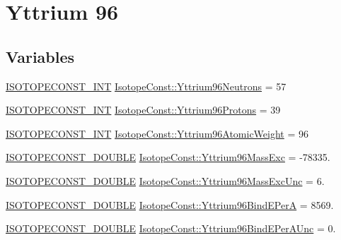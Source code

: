 \hypertarget{group___isotope_const-_yttrium-_y96}{}\section{Yttrium 96}
\label{group___isotope_const-_yttrium-_y96}
\subsection*{Variables}
\begin{DoxyCompactItemize}
\item 
\mbox{\hyperlink{group___isotope_const-_macros_ga5f18360b3e99483a35c32d789e62621c}{I\+S\+O\+T\+O\+P\+E\+C\+O\+N\+S\+T\+\_\+\+I\+NT}} \mbox{\hyperlink{group___isotope_const-_yttrium-_y96_ga6f7455ea9fa7662ee8465133ce6f9dc1}{Isotope\+Const\+::\+Yttrium96\+Neutrons}} = 57
\item 
\mbox{\hyperlink{group___isotope_const-_macros_ga5f18360b3e99483a35c32d789e62621c}{I\+S\+O\+T\+O\+P\+E\+C\+O\+N\+S\+T\+\_\+\+I\+NT}} \mbox{\hyperlink{group___isotope_const-_yttrium-_y96_ga7820171360a6ca71fa8332ae2cbe64d1}{Isotope\+Const\+::\+Yttrium96\+Protons}} = 39
\item 
\mbox{\hyperlink{group___isotope_const-_macros_ga5f18360b3e99483a35c32d789e62621c}{I\+S\+O\+T\+O\+P\+E\+C\+O\+N\+S\+T\+\_\+\+I\+NT}} \mbox{\hyperlink{group___isotope_const-_yttrium-_y96_ga521c7f34e2087461cf78518cf9513ed6}{Isotope\+Const\+::\+Yttrium96\+Atomic\+Weight}} = 96
\item 
\mbox{\hyperlink{group___isotope_const-_macros_ga8f45a7272ce02c0b4c65c44636ed719a}{I\+S\+O\+T\+O\+P\+E\+C\+O\+N\+S\+T\+\_\+\+D\+O\+U\+B\+LE}} \mbox{\hyperlink{group___isotope_const-_yttrium-_y96_gabfd55f5be78d1b7d3553da01d7d8f98f}{Isotope\+Const\+::\+Yttrium96\+Mass\+Exc}} = -\/78335.
\item 
\mbox{\hyperlink{group___isotope_const-_macros_ga8f45a7272ce02c0b4c65c44636ed719a}{I\+S\+O\+T\+O\+P\+E\+C\+O\+N\+S\+T\+\_\+\+D\+O\+U\+B\+LE}} \mbox{\hyperlink{group___isotope_const-_yttrium-_y96_gab457f03a8c8ad2e743f505263498d8eb}{Isotope\+Const\+::\+Yttrium96\+Mass\+Exc\+Unc}} = 6.
\item 
\mbox{\hyperlink{group___isotope_const-_macros_ga8f45a7272ce02c0b4c65c44636ed719a}{I\+S\+O\+T\+O\+P\+E\+C\+O\+N\+S\+T\+\_\+\+D\+O\+U\+B\+LE}} \mbox{\hyperlink{group___isotope_const-_yttrium-_y96_gae68783d7fe01ab2b5602b3629acc1b20}{Isotope\+Const\+::\+Yttrium96\+Bind\+E\+PerA}} = 8569.
\item 
\mbox{\hyperlink{group___isotope_const-_macros_ga8f45a7272ce02c0b4c65c44636ed719a}{I\+S\+O\+T\+O\+P\+E\+C\+O\+N\+S\+T\+\_\+\+D\+O\+U\+B\+LE}} \mbox{\hyperlink{group___isotope_const-_yttrium-_y96_ga80f499a61557d02bb3028f1a9818b200}{Isotope\+Const\+::\+Yttrium96\+Bind\+E\+Per\+A\+Unc}} = 0.

\end{DoxyCompactItemize}

